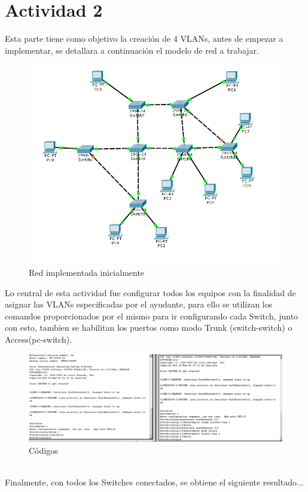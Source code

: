 \documentclass[spanish]{udpreport}
\begin{document}
\section{Actividad 2}
Esta parte tiene como objetivo la creación de 4 VLANs, antes de empezar a implementar, se detallara a continuación el modelo de red a trabajar.
\begin{figure}[h]
    \centering
    \includegraphics[scale=0.4]{images/inib.png}
    \caption{Red implementada inicialmente}
    \label{fig:my_label}
\end{figure}
\newpage
Lo central de esta actividad fue configurar todos los equipos con la finalidad de asignar las VLANs especificadas por el ayudante, para ello se utilizan los comandos proporcionados por el mismo para ir configurando cada Switch, junto con esto, tambien se habilitan los puertos como modo Trunk (switch-switch) o Access(pc-switch).
\begin{figure}[h]
    \centering
    \includegraphics[scale=0.2]{images/3.png}
    \caption{Códigos}
    \label{fig:my_label}
\end{figure}
\\Finalmente, con todos los Switches conectados, se obtiene el siguiente resultado...
\end{document}
